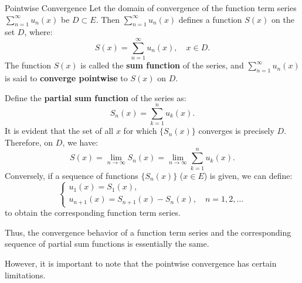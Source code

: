 \documentclass[11pt]{../../TexTemplate/elegantbook}
\begin{document}
\begin{definition}{Pointwise Convergence}
    Let the domain of convergence of the function term series \( \sum_{n=1}^\infty u_n(x) \) be \( D \subset E \). 
    Then \( \sum_{n=1}^\infty u_n(x) \) defines a function \( S(x) \) on the set \( D \), where:
    \[
    S(x) = \sum_{n=1}^\infty u_n(x), \quad x \in D.
    \]
    The function \( S(x) \) is called the \textbf{sum function} of the series, 
    and \( \sum_{n=1}^\infty u_n(x) \) is said to \textbf{converge pointwise} to \( S(x) \) on \( D \).
\end{definition}

Define the \textbf{partial sum function} of the series as:
\[
S_n(x) = \sum_{k=1}^n u_k(x).
\]
It is evident that the set of all \( x \) for which \( \{ S_n(x) \} \) converges is precisely \( D \). 
Therefore, on \( D \), we have:
\[
S(x) = \lim_{n \to \infty} S_n(x) = \lim_{n \to \infty} \sum_{k=1}^n u_k(x).
\]
Conversely, if a sequence of functions \( \{ S_n(x) \} \) (\( x \in E \)) is given, we can define:
\[
\begin{cases}
u_1(x) = S_1(x), \\
u_{n+1}(x) = S_{n+1}(x) - S_n(x), \quad n = 1, 2, \dots
\end{cases}
\]
to obtain the corresponding function term series.

Thus, the convergence behavior of a function term series and the corresponding sequence 
of partial sum functions is essentially the same.

However, it is important to note that the pointwise convergence has certain limitations.
\end{document}

